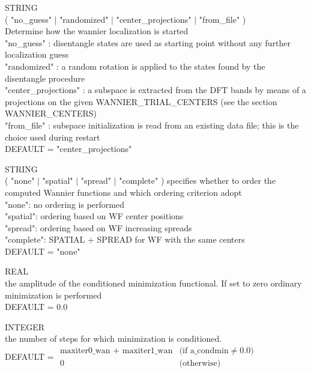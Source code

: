 {\noindent{}%
STRING \\  ( "no\_guess" $\mid$ "randomized" $\mid$ "center\_projections" $\mid$ "from\_file" )\\
 Determine how the wannier localization is started\\
"no\_guess" : disentangle states are used as starting point
                 without any further localization guess\\
"randomized" : a random rotation is applied to the states found by
                 the disentangle procedure\\
"center\_projections" : a subspace is extracted from the DFT bands
                 by means of a projections on the given WANNIER\_TRIAL\_CENTERS
                 (see the section WANNIER\_CENTERS)\\
"from\_file" : subspace initialization is read from an existing data file;
                 this is the choice used during restart \\
DEFAULT = "center\_projections" \par

\noindent{}%
STRING \\ ( "none" $\mid$ "spatial" $\mid$ "spread" $\mid$ "complete" )
specifies whether to order the computed Wannier functions and
              which ordering criterion adopt\\
"none":      no ordering is performed\\
"spatial":   ordering based on WF center positions\\
"spread":    ordering based on WF increasing spreads\\
"complete":  SPATIAL + SPREAD for WF with the same centers\\
DEFAULT = "none" \par

\noindent{}%
REAL \\ the amplitude of the conditioned minimization functional. If set to zero
              ordinary minimization is performed\\ DEFAULT = 0.0 \par

\noindent{}%
INTEGER \\ the number of steps for which minimization is conditioned.\\
DEFAULT = $\begin{array}{ll}
           \textrm{maxiter0\_wan + maxiter1\_wan}   & \textrm{(if a\_condmin} \neq 0.0)\\
           0                                 & \textrm{(otherwise)}
           \end{array} $ \par

}
